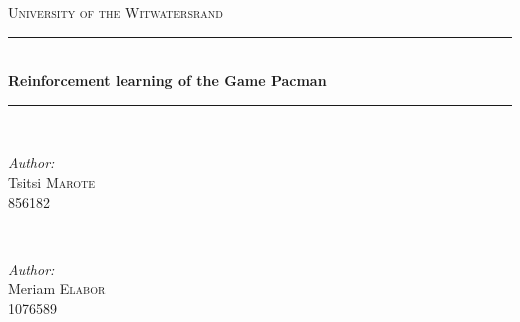 \begin{titlepage}

\newcommand{\HRule}{\rule{\linewidth}{0.5mm}} %

\center %
 

\textsc{\LARGE University of the Witwatersrand}\\[1cm] %


\HRule \\[0.4cm]
{ \huge \bfseries Reinforcement learning of the Game Pacman}\\[0.4cm] %
\HRule \\[1.5cm]
 

\begin{minipage}{0.4\textwidth}
\begin{flushleft} \large
\emph{Author:}\\
Tsitsi \textsc{Marote}\\ 856182 %
\end{flushleft}
\end{minipage}
~
\begin{minipage}{0.4\textwidth}
\begin{flushright} \large
\emph{Author:} \\
Meriam \textsc{Elabor} \\1076589 %
\end{flushright}
\end{minipage}\\[2cm]


\end{titlepage}
